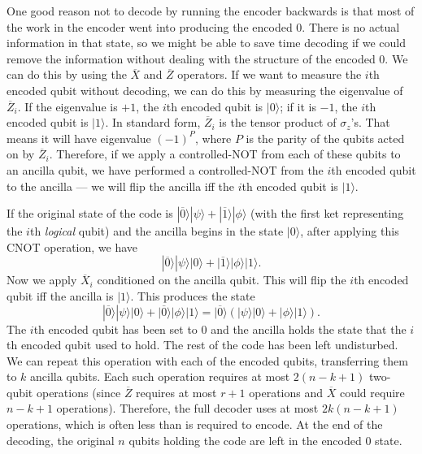 \documentclass{report}
\newcommand{\ket}[1]{|{#1}\rangle}
\newcommand{\Z}{\sigma_z}
\newcommand{\Xbar}{\overline{X}}
\newcommand{\Zbar}{\overline{Z}}
\begin{document}
One good reason not to decode by running the encoder backwards is that 
most of the work in the encoder went into producing the encoded $0$.  
There is no actual information in that state, so we might be able to save 
time decoding if we could remove the information without dealing with the 
structure of the encoded $0$.  We can do this by using the $\Xbar$ and 
$\Zbar$ operators.  If we want to measure the $i$th encoded qubit 
without decoding, we can do this by measuring the eigenvalue of 
$\Zbar_i$.  If the eigenvalue is $+1$, the $i$th encoded qubit is $\ket{0}$; 
if it is $-1$, the $i$th encoded qubit is $\ket{1}$.  In standard form, 
$\Zbar_i$ is the tensor product of $\Z$'s.  That means it will have 
eigenvalue $(-1)^P$, where $P$ is the parity of the qubits acted on by 
$\Zbar_i$.  Therefore, if we apply a controlled-NOT from each of these 
qubits to an ancilla qubit, we have performed a controlled-NOT from the 
$i$th encoded qubit to the ancilla --- we will flip the ancilla iff the $i$th 
encoded qubit is $\ket{1}$.

If the original state of the code is $\ket{\overline{0}} \ket{\psi} + 
\ket{\overline{1}} \ket{\phi}$ (with the first ket representing the $i$th 
{\em logical} qubit) and the ancilla begins in the state $\ket{0}$, after 
applying this CNOT operation, we have
\begin{equation}
\ket{\overline{0}} \ket{\psi} \ket{0} + \ket{\overline{1}} \ket{\phi} 
\ket{1}.
\end{equation}
Now we apply $\Xbar_i$ conditioned on the ancilla qubit.  This will flip the 
$i$th encoded qubit iff the ancilla is $\ket{1}$.  This produces the state
\begin{equation}
\ket{\overline{0}} \ket{\psi} \ket{0} + \ket{\overline{0}} \ket{\phi} 
\ket{1} = \ket{\overline{0}} \left(\ket{\psi} \ket{0} + \ket{\phi} \ket{1} 
\right).
\end{equation}
The $i$th encoded qubit has been set to $0$ and the ancilla holds the state 
that the $i$th encoded qubit used to hold.  The rest of the code has been 
left undisturbed.  We can repeat this operation with each of the encoded 
qubits, transferring them to $k$ ancilla qubits.  Each such operation requires 
at most $2(n-k+1)$ two-qubit operations (since $\Zbar$ requires at most $r + 1$ 
operations and $\Xbar$ could require $n-k+1$ operations).  Therefore, the 
full decoder uses at most $2k(n-k+1)$ operations, which is often less than 
is required to encode.  At the end of the decoding, the original $n$ qubits 
holding the code are left in the encoded $0$ state.
\end{document}
